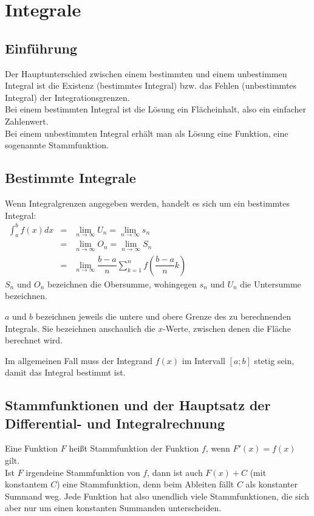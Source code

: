 \chapter{Integrale}
\section{Einführung}
Der Hauptunterschied zwischen einem bestimmten und einem unbestimmen Integral ist die Existenz (bestimmtes Integral) bzw. das Fehlen
(unbestimmtes Integral) der Integrationsgrenzen.\\
Bei einem bestimmten Integral ist die Lösung ein Flächeinhalt, also ein einfacher Zahlenwert.\\
Bei einem unbestimmten Integral erhält man als Lösung eine Funktion, eine sogenannte Stammfunktion.\\


\section{Bestimmte Integrale}
\begin{Definition}
  Wenn Integralgrenzen angegeben werden, handelt es sich um ein bestimmtes Integral:\\
  $
  \begin{array}{rcl}
    \int_{a}^{b} f(x)dx & = & \lim\limits_{n \rightarrow \infty} U_n = \lim\limits_{n \rightarrow \infty} s_n\\
                         & = & \lim\limits_{n \rightarrow \infty} O_n = \lim\limits_{n \rightarrow \infty} S_n\\
                         & = & \lim\limits_{n \rightarrow \infty} \dfrac{b-a}{n}\sum\limits_{k=1}^{n}f(\dfrac{b-a}{n}k)
  \end{array}
  $\\
  $S_n$ und $O_n$ bezeichnen die Obersumme, wohingegen $s_n$ und $U_n$ die Untersumme bezeichnen.
\end{Definition}
\begin{Bemerkung}
  $a$ und $b$ bezeichnen jeweils die untere und obere Grenze des zu berechnenden Integrals. Sie bezeichnen anschaulich die $x$-Werte, zwischen denen die Fläche berechnet wird.
\end{Bemerkung}
\begin{Bemerkung}
  Im allgemeinen Fall muss der Integrand $f(x)$ im Intervall $[a;b]$ stetig sein, damit das Integral bestimmt ist.
\end{Bemerkung}

\section{Stammfunktionen und der Hauptsatz der Differential- und Integralrechnung}
\begin{Definition}
  Eine Funktion $F$ heißt Stammfunktion der Funktion $f$, wenn $F'(x)=f(x)$
  gilt.\\
  Ist $F$ irgendeine Stammfunktion von $f$, dann ist auch $F(x)+C$ (mit
  konstantem $C$) eine Stammfunktion, denn beim Ableiten fällt $C$ als
  konstanter Summand weg. Jede Funktion hat also unendlich viele
  Stammfunktionen, die sich aber nur um einen konstanten Summanden
  unterscheiden.
\end{Definition}
